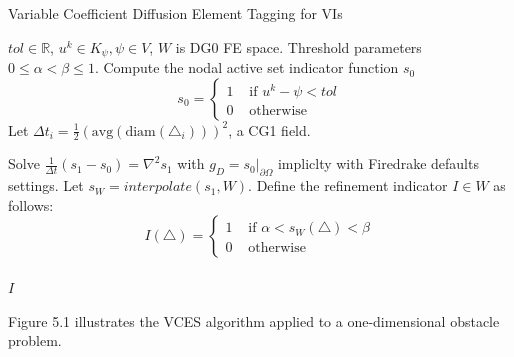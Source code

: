 \documentclass[]{interact}
\theoremstyle{plain}%
\theoremstyle{definition}
\theoremstyle{remark}
\begin{document}
\begin{algorithm}[H]
	\caption{Variable Coefficient Diffusion Element Tagging for VIs}\label{alg:cap}
	\begin{algorithmic}[1]
		\Require $tol \in \mathbb{R}$, $u^k \in K_\psi, \psi \in V$, $W$ is DG0 FE space.
		\Require Threshold parameters $0\leq \alpha < \beta \leq 1$.
		\State Compute the nodal active set indicator function $s_0$
		  \begin{equation*}
			s_0 = \begin{cases}
			  1 & \text{ if } u^k - \psi < tol\\
			  0 & \text{ otherwise}
			\end{cases}
		  \end{equation*}
		\State Let $\Delta t_i = \frac{1}{2}(\text{avg}(\text{diam}(\triangle_i)))^2$, a CG1 field.
	  
		\State Solve $\frac{1}{\Delta t}(s_1 - s_0) = \nabla^2 s_1$ with $g_D = s_0|_{\partial\Omega}$ impliclty with Firedrake defaults settings. 
		\State Let $s_W = interpolate(s_1, W)$.
		\State Define the refinement indicator $I \in W$ as follows:
		\begin{equation*}
		  I(\triangle) = \begin{cases}
			1 & \text{ if } \alpha < s_W(\triangle) < \beta\\
			0 & \text{ otherwise}
		  \end{cases}
		\end{equation*}\\
		\Return $I$
	\end{algorithmic}
	\end{algorithm}

Figure 5.1 illustrates the VCES algorithm applied to a one-dimensional obstacle problem.
\end{document}
